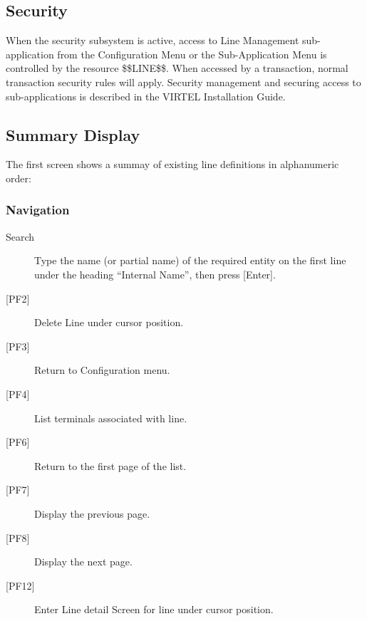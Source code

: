 \documentclass[letterpaper,10pt,english]{sphinxmanual}
\begin{document}
\subsection{Security}
\label{\detokenize{connectivity_guide:security}}
When the security subsystem is active, access to Line Management sub-application from the Configuration Menu or the Sub-Application Menu is controlled by the resource \$\$LINE\$\$.
When accessed by a transaction, normal transaction security rules will apply. Security management and securing access to sub-applications is described in the VIRTEL Installation Guide.


\subsection{Summary Display}
\label{\detokenize{connectivity_guide:index-6}}\label{\detokenize{connectivity_guide:summary-display}}
The first screen shows a summay of existing line definitions in alphanumeric order:



\subsubsection{Navigation}
\label{\detokenize{connectivity_guide:navigation}}\begin{description}
\item[{Search}] \leavevmode
Type the name (or partial name) of the required entity on the first line under the heading “Internal Name”, then press {[}Enter{]}.

\item[{{[}PF2{]}}] \leavevmode
Delete Line under cursor position.

\item[{{[}PF3{]}}] \leavevmode
Return to Configuration menu.

\item[{{[}PF4{]}}] \leavevmode
List terminals associated with line.

\item[{{[}PF6{]}}] \leavevmode
Return to the first page of the list.

\item[{{[}PF7{]}}] \leavevmode
Display the previous page.

\item[{{[}PF8{]}}] \leavevmode
Display the next page.

\item[{{[}PF12{]}}] \leavevmode
Enter Line detail Screen for line under cursor position.

\end{description}
\end{document}

